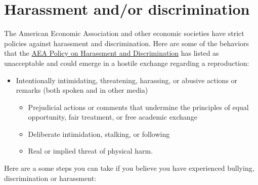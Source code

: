 \documentclass[
]{book}
\providecommand{\tightlist}{%
  \setlength{\itemsep}{0pt}\setlength{\parskip}{0pt}}
\begin{document}
\hypertarget{harassment-andor-discrimination}{%
\section{Harassment and/or discrimination}\label{harassment-andor-discrimination}}

The American Economic Association and other economic societies have strict policies against harassment and discrimination. Here are some of the behaviors that the \href{https://www.aeaweb.org/about-aea/aea-policy-harassment-discrimination}{AEA Policy on Harassment and Discrimination} has listed as unacceptable and could emerge in a hostile exchange regarding a reproduction:

\begin{itemize}
\tightlist
\item
  Intentionally intimidating, threatening, harassing, or abusive actions or remarks (both spoken and in other media)

  \begin{itemize}
  \tightlist
  \item
    Prejudicial actions or comments that undermine the principles of equal opportunity, fair treatment, or free academic exchange
  \item
    Deliberate intimidation, stalking, or following
  \item
    Real or implied threat of physical harm.
  \end{itemize}
\end{itemize}

Here are a some steps you can take if you believe you have experienced bullying, discrimination or harassment:
\end{document}
